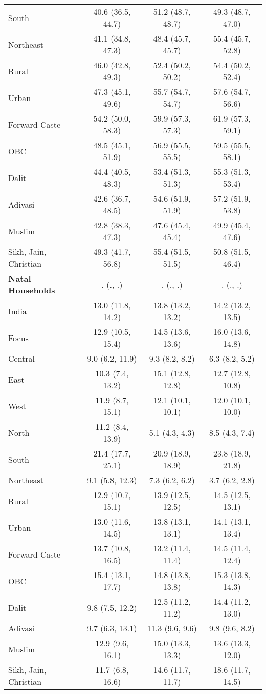 \begin{tabular}{lccc}
South&40.6 (36.5, 44.7)&51.2 (48.7, 48.7)&49.3 (48.7, 47.0)\\
Northeast&41.1 (34.8, 47.3)&48.4 (45.7, 45.7)&55.4 (45.7, 52.8)\\
Rural&46.0 (42.8, 49.3)&52.4 (50.2, 50.2)&54.4 (50.2, 52.4)\\
Urban&47.3 (45.1, 49.6)&55.7 (54.7, 54.7)&57.6 (54.7, 56.6)\\
Forward Caste&54.2 (50.0, 58.3)&59.9 (57.3, 57.3)&61.9 (57.3, 59.1)\\
OBC&48.5 (45.1, 51.9)&56.9 (55.5, 55.5)&59.5 (55.5, 58.1)\\
Dalit&44.4 (40.5, 48.3)&53.4 (51.3, 51.3)&55.3 (51.3, 53.4)\\
Adivasi&42.6 (36.7, 48.5)&54.6 (51.9, 51.9)&57.2 (51.9, 53.8)\\
Muslim&42.8 (38.3, 47.3)&47.6 (45.4, 45.4)&49.9 (45.4, 47.6)\\
Sikh, Jain, Christian&49.3 (41.7, 56.8)&55.4 (51.5, 51.5)&50.8 (51.5, 46.4)\\
\textbf{Natal Households}&. (., .)&. (., .)&. (., .)\\
India&13.0 (11.8, 14.2)&13.8 (13.2, 13.2)&14.2 (13.2, 13.5)\\
Focus&12.9 (10.5, 15.4)&14.5 (13.6, 13.6)&16.0 (13.6, 14.8)\\
Central&9.0 (6.2, 11.9)&9.3 (8.2, 8.2)&6.3 (8.2, 5.2)\\
East&10.3 (7.4, 13.2)&15.1 (12.8, 12.8)&12.7 (12.8, 10.8)\\
West&11.9 (8.7, 15.1)&12.1 (10.1, 10.1)&12.0 (10.1, 10.0)\\
North&11.2 (8.4, 13.9)&5.1 (4.3, 4.3)&8.5 (4.3, 7.4)\\
South&21.4 (17.7, 25.1)&20.9 (18.9, 18.9)&23.8 (18.9, 21.8)\\
Northeast&9.1 (5.8, 12.3)&7.3 (6.2, 6.2)&3.7 (6.2, 2.8)\\
Rural&12.9 (10.7, 15.1)&13.9 (12.5, 12.5)&14.5 (12.5, 13.1)\\
Urban&13.0 (11.6, 14.5)&13.8 (13.1, 13.1)&14.1 (13.1, 13.4)\\
Forward Caste&13.7 (10.8, 16.5)&13.2 (11.4, 11.4)&14.5 (11.4, 12.4)\\
OBC&15.4 (13.1, 17.7)&14.8 (13.8, 13.8)&15.3 (13.8, 14.3)\\
Dalit&9.8 (7.5, 12.2)&12.5 (11.2, 11.2)&14.4 (11.2, 13.0)\\
Adivasi&9.7 (6.3, 13.1)&11.3 (9.6, 9.6)&9.8 (9.6, 8.2)\\
Muslim&12.9 (9.6, 16.1)&15.0 (13.3, 13.3)&13.6 (13.3, 12.0)\\
Sikh, Jain, Christian&11.7 (6.8, 16.6)&14.6 (11.7, 11.7)&18.6 (11.7, 14.5)\\
\bottomrule
\end{tabular}
